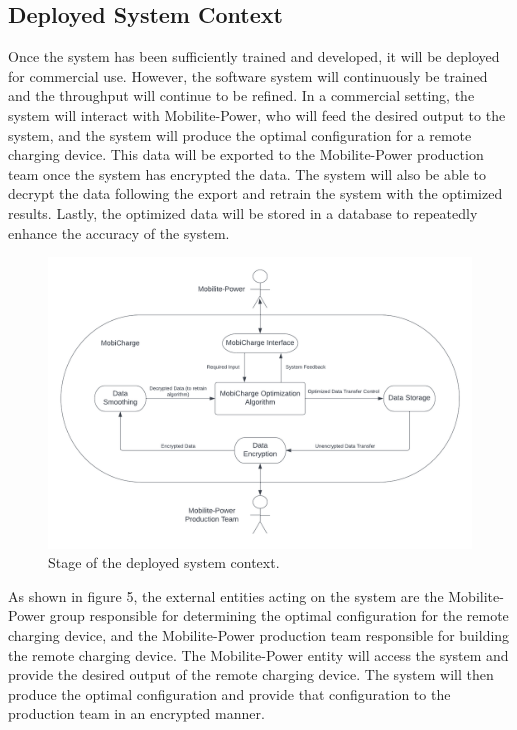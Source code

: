 \documentclass[12pt, titlepage]{article}
\begin{document}
\subsection{Deployed System Context}
Once the system has been sufficiently trained and developed, it will be deployed for commercial use. However, the software system will continuously be trained and the throughput will continue to be refined. In a commercial setting, the system will interact with Mobilite-Power, who will feed the desired output to the system, and the system will produce the optimal configuration for a remote charging device. This data will be exported to the Mobilite-Power production team once the system has encrypted the data. The system will also be able to decrypt the data following the export and retrain the system with the optimized results. Lastly, the optimized data will be stored in a database to repeatedly enhance the accuracy of the system.
\newpage
\begin{figure}[htp]
    \centering
    \includegraphics[width=15cm]{images/context3.png}
    \caption[Deployed System Contexts 1]{Stage of the deployed system context.}
    \label{fig:figure5}
\end{figure}
As shown in figure 5, the external entities acting on the system are the Mobilite-Power group responsible for determining the optimal configuration for the remote charging device, and the Mobilite-Power production team responsible for building the remote charging device. The Mobilite-Power entity will access the system and provide the desired output of the remote charging device. The system will then produce the optimal configuration and provide that configuration to the production team in an encrypted manner. 
\end{document}
